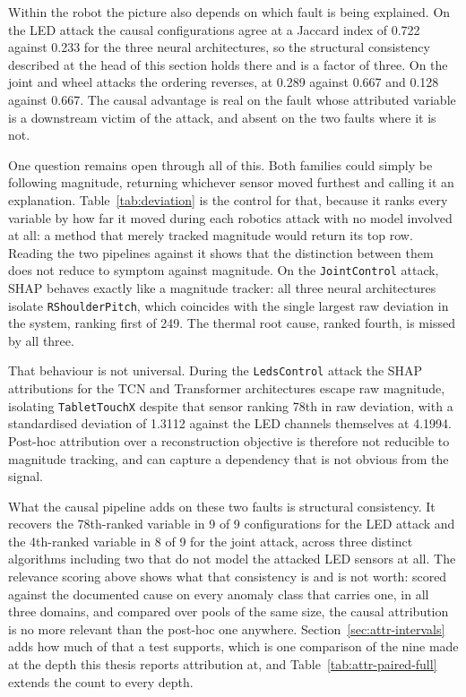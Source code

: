 Within the robot the picture also depends on which fault is being explained. On
the LED attack the causal configurations agree at a Jaccard index of 0.722
against 0.233 for the three neural architectures, so the structural consistency
described at the head of this section holds there and is a factor of three.
On the joint and wheel attacks the ordering reverses, at 0.289 against 0.667 and
0.128 against 0.667. The causal advantage is real on the fault whose attributed
variable is a downstream victim of the attack, and absent on the two faults
where it is not.



One question remains open through all of this. Both families could simply be following magnitude, returning whichever sensor moved furthest and calling it an explanation. Table~\ref{tab:deviation} is the control for that, because it ranks every variable by how far it moved during each robotics attack with no model involved at all: a method that merely tracked magnitude would return its top row. Reading the two pipelines against it shows that the distinction between them does not reduce to symptom against magnitude. On the \texttt{JointControl} attack, SHAP behaves exactly like a magnitude tracker: all three neural architectures isolate \texttt{RShoulderPitch}, which coincides with the single largest raw deviation in the system, ranking first of 249. The thermal root cause, ranked fourth, is missed by all three.

That behaviour is not universal. During the \texttt{LedsControl} attack the SHAP attributions for the TCN and Transformer architectures escape raw magnitude, isolating \texttt{TabletTouchX} despite that sensor ranking 78th in raw deviation, with a standardised deviation of 1.3112 against the LED channels themselves at 4.1994. Post-hoc attribution over a reconstruction objective is therefore not reducible to magnitude tracking, and can capture a dependency that is not obvious from the signal.

What the causal pipeline adds on these two faults is structural consistency. It recovers the 78th-ranked variable in 9 of 9 configurations for the LED attack and the 4th-ranked variable in 8 of 9 for the joint attack, across three distinct algorithms including two that do not model the attacked LED sensors at all. The relevance scoring above shows what that consistency is and is not worth: scored against the documented cause on every anomaly class that carries one, in all three domains, and compared over pools of the same size, the causal attribution is no more relevant than the post-hoc one anywhere. Section~\ref{sec:attr-intervals} adds how much of that a test supports, which is one comparison of the nine made at the depth this thesis reports attribution at, and Table~\ref{tab:attr-paired-full} extends the count to every depth.

